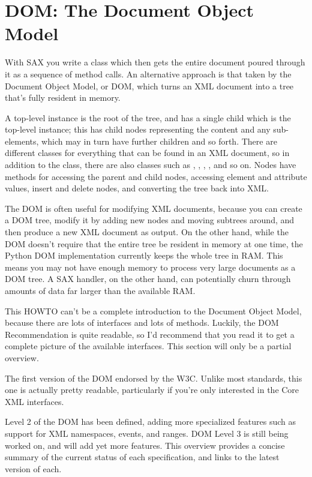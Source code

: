 \documentclass{howto}
\begin{document}
\section{DOM: The Document Object Model}
\label{section-DOM}

With SAX you write a class which then gets the entire document poured
through it as a sequence of method calls.  An alternative approach is
that taken by the Document Object Model, or DOM, which turns an XML
document into a tree that's fully resident in memory.  

A top-level  instance is the root of the tree, and has
a single child which is the top-level  instance; this
 has child nodes representing the content and any
sub-elements, which may in turn have further children and so forth.
There are different classes for everything that can be found in an XML
document, so in addition to the  class, there are also
classes such as , , ,
, and so on.  Nodes have methods for
accessing the parent and child nodes, accessing element and attribute
values, insert and delete nodes, and converting the tree back into XML.

The DOM is often useful for modifying XML documents, because you can
create a DOM tree, modify it by adding new nodes and moving subtrees
around, and then produce a new XML document as output.  On the other
hand, while the DOM doesn't require that the entire tree be resident
in memory at one time, the Python DOM implementation currently keeps
the whole tree in RAM.  This means you may not have enough memory to
process very large documents as a DOM tree.  A SAX handler, on the
other hand, can potentially churn through amounts of data far larger
than the available RAM.

This HOWTO can't be a complete introduction to the Document Object
Model, because there are lots of interfaces and lots of
methods. Luckily, the DOM Recommendation is quite readable, so I'd
recommend that you read it to get a complete picture of the available
interfaces.  This section will only be a partial overview.


\begin{seealso}
           {The first version of the DOM endorsed by the W3C.  Unlike
            most standards, this one is actually pretty readable,
            particularly if you're only interested in the Core XML
            interfaces.}

           {Level 2 of the DOM has been defined, adding more
            specialized features such as support for XML namespaces,
            events, and ranges.  DOM Level 3 is still being worked on,
            and will add yet more features.  This overview provides a
            concise summary of the current status of each
            specification, and links to the latest version of each.}
\end{seealso}
\end{document}
